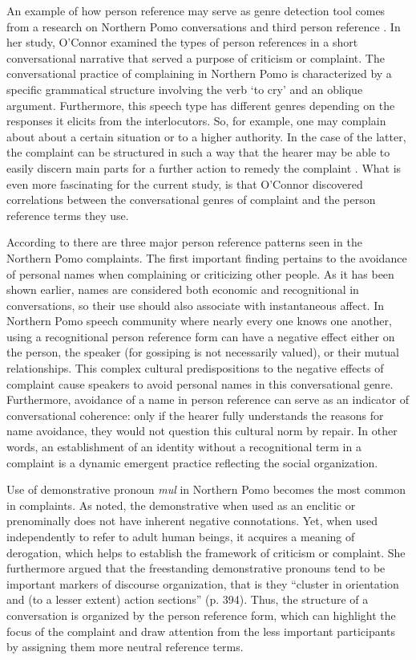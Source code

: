 \documentclass[12pt, draft]{article}
\begin{document}
An example of how person reference may serve as genre detection tool comes from a research on Northern Pomo conversations and third person reference \parencite{oconnor1990}. In her study, O'Connor examined the types of person references in a short conversational narrative that served a purpose of criticism or complaint. The conversational practice of complaining in Northern Pomo is characterized by a specific grammatical structure involving the verb `to cry' and an oblique argument. Furthermore, this speech type has different genres depending on the responses it elicits from the interlocutors. So, for example, one may complain about about a certain situation or to a higher authority. In the case of the latter, the complaint can be structured in such a way that the hearer may be able to easily discern main parts for a further action to remedy the complaint \parencite[p. 381]{oconnor1990}. What is even more fascinating for the current study, is that O'Connor discovered correlations between the conversational genres of complaint and the person reference terms they use. 

According to \textcite{oconnor1990} there are three major person reference patterns seen in the Northern Pomo complaints. The first important finding pertains to the avoidance of personal names when complaining or criticizing other people. As it has been shown earlier, names are considered both economic and recognitional in conversations, so their use should also associate with instantaneous affect. In Northern Pomo speech community where nearly every one knows one another, using a recognitional person reference form can have a negative effect either on the person, the speaker (for gossiping is not necessarily valued), or their mutual relationships. This complex cultural predispositions to the negative effects of complaint cause speakers to avoid personal names in this conversational genre. Furthermore, avoidance of a name in person reference can serve as an indicator of conversational coherence: only if the hearer fully understands the reasons for name avoidance, they would not question this cultural norm by repair. In other words, an establishment of an identity without a recognitional term in a complaint is a dynamic emergent practice reflecting the social organization.

Use of demonstrative pronoun \textit{mul} in Northern Pomo becomes the most common in complaints. As \textcite{oconnor1990} noted, the demonstrative when used as an enclitic or prenominally does not have inherent negative connotations. Yet, when used independently to refer to adult human beings, it acquires a meaning of derogation, which helps to establish the framework of criticism or complaint. She furthermore argued that the freestanding demonstrative pronouns tend to be important markers of discourse organization, that is they ``cluster in orientation and (to a lesser extent) action sections'' (p. 394). Thus, the structure of a conversation is organized by the person reference form, which can highlight the focus of the complaint and draw attention from the less important participants by assigning them more neutral reference terms. 
\end{document}
